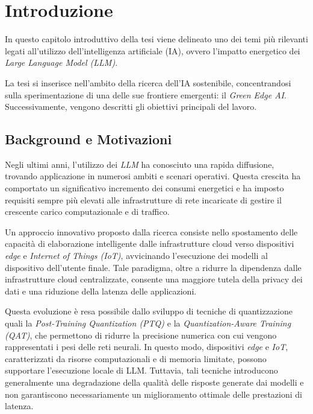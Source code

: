 \chapter{Introduzione}

In questo capitolo introduttivo della tesi viene delineato uno dei temi più
rilevanti legati all'utilizzo dell'intelligenza artificiale (IA), ovvero
l'impatto energetico dei \textit{Large Language Model (LLM)}.

La tesi si inserisce nell'ambito della ricerca dell'IA sostenibile,
concentrandosi sulla sperimentazione di una delle sue frontiere emergenti:
il \textit{Green Edge AI}. Successivamente, vengono descritti gli obiettivi
principali del lavoro.

\section{Background e Motivazioni}

Negli ultimi anni, l'utilizzo dei \textit{LLM} ha conosciuto una rapida
diffusione, trovando applicazione in numerosi ambiti e scenari operativi.
Questa crescita ha comportato un significativo incremento dei consumi
energetici e ha imposto requisiti sempre più elevati alle infrastrutture
di rete incaricate di gestire il crescente carico computazionale e di
traffico.

Un approccio innovativo proposto dalla ricerca consiste nello spostamento
delle capacità di elaborazione intelligente dalle infrastrutture cloud verso
dispositivi \textit{edge} e \textit{Internet of Things (IoT)}, avvicinando
l'esecuzione dei modelli al dispositivo dell'utente finale. Tale paradigma,
oltre a ridurre la dipendenza dalle infrastrutture cloud centralizzate,
consente una maggiore tutela della privacy dei dati e una riduzione della
latenza delle applicazioni.

Questa evoluzione è resa possibile dallo sviluppo di tecniche di
quantizzazione quali la \textit{Post-Training Quantization (PTQ)} e la
\textit{Quantization-Aware Training (QAT)}, che permettono di ridurre la
precisione numerica con cui vengono rappresentati i pesi delle reti neurali.
In questo modo, dispositivi \textit{edge} e \textit{IoT}, caratterizzati da
risorse computazionali e di memoria limitate, possono supportare l'esecuzione
locale di LLM. Tuttavia, tali tecniche introducono generalmente una
degradazione della qualità delle risposte generate dai modelli e non
garantiscono necessariamente un miglioramento ottimale delle prestazioni
di latenza.


